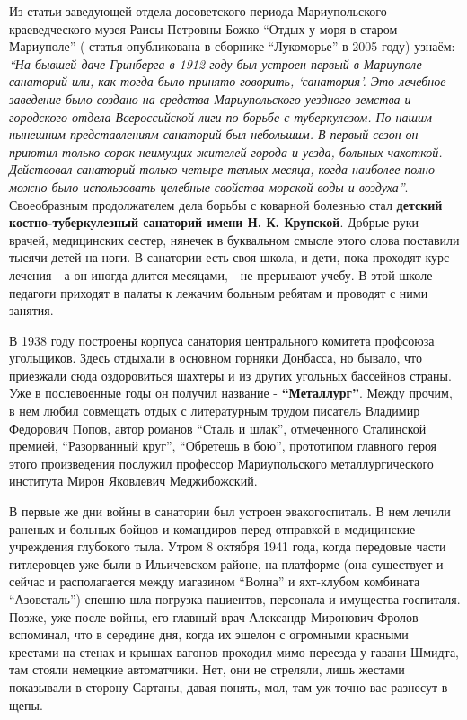 Из статьи заведующей отдела досоветского периода Мариупольского краеведческого
музея Раисы Петровны Божко \enquote{Отдых у моря в старом Мариуполе} ( статья
опубликована в сборнике \enquote{Лукоморье} в 2005 году) узнаём: \emph{\enquote{На бывшей даче
Гринберга в 1912 году был устроен первый в Мариуполе санаторий или, как тогда
было принято говорить, \enquote{санатория}. Это лечебное заведение было создано на
средства Мариупольского уездного земства и городского отдела Всероссийской лиги
по борьбе с туберкулезом. По нашим нынешним представлениям санаторий был
небольшим. В первый сезон он приютил только сорок неимущих жителей города и
уезда, больных чахоткой. Действовал санаторий только четыре теплых месяца,
когда наиболее полно можно было использовать целебные свойства морской воды и
воздуха}}. Своеобразным продолжателем дела борьбы с коварной болезнью стал
\textbf{детский костно-туберкулезный санаторий имени Н. К. Крупской}. Добрые руки врачей,
медицинских сестер, нянечек в буквальном смысле этого слова поставили тысячи
детей на ноги. В санатории есть своя школа, и дети, пока проходят курс лечения
- а он иногда длится месяцами, - не прерывают учебу. В этой школе педагоги
приходят в палаты к лежачим больным ребятам и проводят с ними занятия.


В 1938 году построены корпуса санатория центрального комитета профсоюза
угольщиков. Здесь отдыхали в основном горняки Донбасса, но бывало, что
приезжали сюда оздоровиться шахтеры и из других угольных бассейнов страны. Уже
в послевоенные годы он получил название - \textbf{\enquote{Металлург}}. Между прочим, в нем
любил совмещать отдых с литературным трудом писатель Владимир Федорович Попов,
автор романов \enquote{Сталь и шлак}, отмеченного Сталинской премией, \enquote{Разорванный
круг}, \enquote{Обретешь в бою}, прототипом главного героя этого произведения послужил
профессор Мариупольского металлургического института Мирон Яковлевич
Меджибожский.


В первые же дни войны в санатории был устроен эвакогоспиталь. В нем лечили
раненых и больных бойцов и командиров перед отправкой в медицинские учреждения
глубокого тыла. Утром 8 октября 1941 года, когда передовые части гитлеровцев
уже были в Ильичевском районе, на платформе (она существует и сейчас и
располагается между магазином \enquote{Волна} и яхт-клубом комбината \enquote{Азовсталь})
спешно шла погрузка пациентов, персонала и имущества госпиталя. Позже, уже
после войны, его главный врач Александр Миронович Фролов вспоминал, что в
середине дня, когда их эшелон с огромными красными крестами на стенах и крышах
вагонов проходил мимо переезда у гавани Шмидта, там стояли немецкие
автоматчики. Нет, они не стреляли, лишь жестами показывали в сторону Сартаны,
давая понять, мол, там уж точно вас разнесут в щепы.

